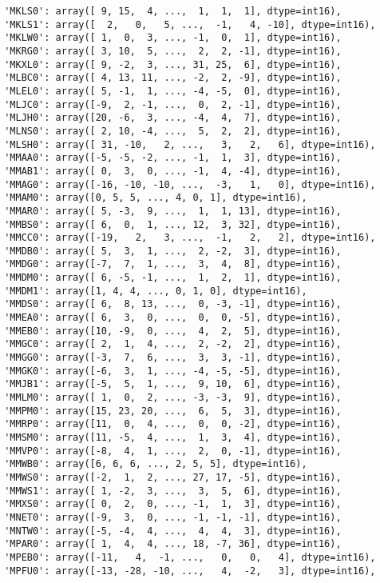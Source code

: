\documentclass[11pt]{article}
\begin{document}
\begin{verbatim}
 'MKLS0': array([ 9, 15,  4, ...,  1,  1,  1], dtype=int16),
 'MKLS1': array([  2,   0,   5, ...,  -1,   4, -10], dtype=int16),
 'MKLW0': array([ 1,  0,  3, ..., -1,  0,  1], dtype=int16),
 'MKRG0': array([ 3, 10,  5, ...,  2,  2, -1], dtype=int16),
 'MKXL0': array([ 9, -2,  3, ..., 31, 25,  6], dtype=int16),
 'MLBC0': array([ 4, 13, 11, ..., -2,  2, -9], dtype=int16),
 'MLEL0': array([ 5, -1,  1, ..., -4, -5,  0], dtype=int16),
 'MLJC0': array([-9,  2, -1, ...,  0,  2, -1], dtype=int16),
 'MLJH0': array([20, -6,  3, ..., -4,  4,  7], dtype=int16),
 'MLNS0': array([ 2, 10, -4, ...,  5,  2,  2], dtype=int16),
 'MLSH0': array([ 31, -10,   2, ...,   3,   2,   6], dtype=int16),
 'MMAA0': array([-5, -5, -2, ..., -1,  1,  3], dtype=int16),
 'MMAB1': array([ 0,  3,  0, ..., -1,  4, -4], dtype=int16),
 'MMAG0': array([-16, -10, -10, ...,  -3,   1,   0], dtype=int16),
 'MMAM0': array([0, 5, 5, ..., 4, 0, 1], dtype=int16),
 'MMAR0': array([ 5, -3,  9, ...,  1,  1, 13], dtype=int16),
 'MMBS0': array([ 6,  0,  1, ..., 12,  3, 32], dtype=int16),
 'MMCC0': array([-19,   2,   3, ...,  -1,   2,   2], dtype=int16),
 'MMDB0': array([ 5,  3,  1, ...,  2, -2,  3], dtype=int16),
 'MMDG0': array([-7,  7,  1, ...,  3,  4,  8], dtype=int16),
 'MMDM0': array([ 6, -5, -1, ...,  1,  2,  1], dtype=int16),
 'MMDM1': array([1, 4, 4, ..., 0, 1, 0], dtype=int16),
 'MMDS0': array([ 6,  8, 13, ...,  0, -3, -1], dtype=int16),
 'MMEA0': array([ 6,  3,  0, ...,  0,  0, -5], dtype=int16),
 'MMEB0': array([10, -9,  0, ...,  4,  2,  5], dtype=int16),
 'MMGC0': array([ 2,  1,  4, ...,  2, -2,  2], dtype=int16),
 'MMGG0': array([-3,  7,  6, ...,  3,  3, -1], dtype=int16),
 'MMGK0': array([-6,  3,  1, ..., -4, -5, -5], dtype=int16),
 'MMJB1': array([-5,  5,  1, ...,  9, 10,  6], dtype=int16),
 'MMLM0': array([ 1,  0,  2, ..., -3, -3,  9], dtype=int16),
 'MMPM0': array([15, 23, 20, ...,  6,  5,  3], dtype=int16),
 'MMRP0': array([11,  0,  4, ...,  0,  0, -2], dtype=int16),
 'MMSM0': array([11, -5,  4, ...,  1,  3,  4], dtype=int16),
 'MMVP0': array([-8,  4,  1, ...,  2,  0, -1], dtype=int16),
 'MMWB0': array([6, 6, 6, ..., 2, 5, 5], dtype=int16),
 'MMWS0': array([-2,  1,  2, ..., 27, 17, -5], dtype=int16),
 'MMWS1': array([ 1, -2,  3, ...,  3,  5,  6], dtype=int16),
 'MMXS0': array([ 0,  2,  0, ..., -1,  1,  3], dtype=int16),
 'MNET0': array([-9,  3,  0, ..., -1, -1, -1], dtype=int16),
 'MNTW0': array([-5, -4,  4, ...,  4,  4,  3], dtype=int16),
 'MPAR0': array([ 1,  4,  4, ..., 18, -7, 36], dtype=int16),
 'MPEB0': array([-11,   4,  -1, ...,   0,   0,   4], dtype=int16),
 'MPFU0': array([-13, -28, -10, ...,   4,  -2,   3], dtype=int16),

\end{verbatim}
\end{document}
